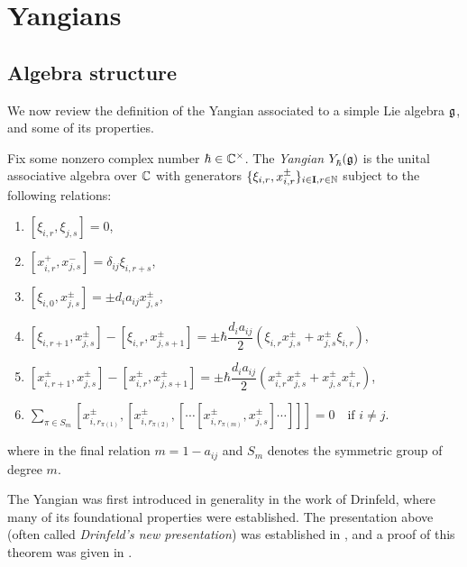 \section{Yangians}

\subsection{Algebra structure}

We now review the definition of the Yangian associated to a simple Lie algebra $\mathfrak{g}$, and some of its properties.

\begin{definition}\label{D:Y}
    Fix some nonzero complex number $\hbar\in\mathbb{C}^\times$.
    The \emph{Yangian} $Y_\hbar^{}(\mathfrak{g})$ is the unital associative algebra over $\mathbb{C}$ with generators $\{\xi_{i,r}, x^\pm_{i,r}\}_{i\in\mathbf{I},r\in\mathbb{N}}$ subject to the following relations:
    \begin{enumerate}
        \item $[\xi_{i,r},\xi_{j,s}] = 0$,
        \item $[x^+_{i,r},x^-_{j,s}] = \delta_{ij}\xi_{i,r+s}$,
        \item $[\xi_{i,0},x^\pm_{j,s}] = \pm d_ia_{ij}x^\pm_{j,s}$,
        \item $[\xi_{i,r+1},x^\pm_{j,s}]-[\xi_{i,r},x^\pm_{j,s+1}] = \pm\hbar\dfrac{d_ia_{ij}}{2}(\xi_{i,r}x^\pm_{j,s}+x^\pm_{j,s}\xi_{i,r})$,
        \item $[x^\pm_{i,r+1},x^\pm_{j,s}]-[x^\pm_{i,r},x^\pm_{j,s+1}] = \pm\hbar\dfrac{d_ia_{ij}}{2}(x^\pm_{i,r}x^\pm_{j,s}+x^\pm_{j,s}x^\pm_{i,r})$,
        \item $\displaystyle\sum\limits_{\pi\in S_m}[x^\pm_{i,r_{\pi(1)}}, [x^\pm_{i,r_{\pi(2)}}, [\cdots[x^\pm_{i,r_{\pi(m)}}, x^\pm_{j,s}]\cdots]]]=0 \quad\text{if } i\neq j$.
    \end{enumerate}
    where in the final relation $m=1-a_{ij}$ and $S_m$ denotes the symmetric group of degree $m$.
\end{definition}

The Yangian was first introduced in generality in the work \cite{drinfeld_hopf_1985} of Drinfeld, where many of its foundational properties were established.
The presentation above (often called \emph{Drinfeld's new presentation}) was established in \cite[Thm. 1]{drinfeld_new_1988}, and a proof of this theorem was given in \cite[Thm. 2.6]{guay_equivalences_2019}.

